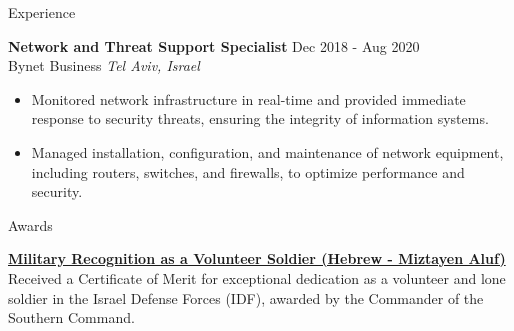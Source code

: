\documentclass{resume}
\begin{document}
\vspace{5pt}

\begin{rSection}{Experience}

\textbf{Network and Threat Support Specialist} \hfill Dec 2018 - Aug 2020\\
Bynet Business \hfill \textit{Tel Aviv, Israel}
 \begin{itemize}
    \item Monitored network infrastructure in real-time and provided immediate response to security threats, ensuring the integrity of information systems.
    \item Managed installation, configuration, and maintenance of network equipment, including routers, switches, and firewalls, to optimize performance and security.
 \end{itemize}
\end{rSection}



\vspace{10pt}


\begin{rSection}{Awards}

\textbf{\href{https://drive.google.com/file/d/1QWiVud-gSK4n_YLskh-mxVn0zGRxDvHW/view?usp=sharing}{Military Recognition as a Volunteer Soldier (Hebrew - Miztayen Aluf)}} \\
Received a Certificate of Merit for exceptional dedication as a volunteer and lone soldier in the Israel Defense Forces (IDF), awarded by the Commander of the Southern Command.

\end{rSection} 
\end{document}
